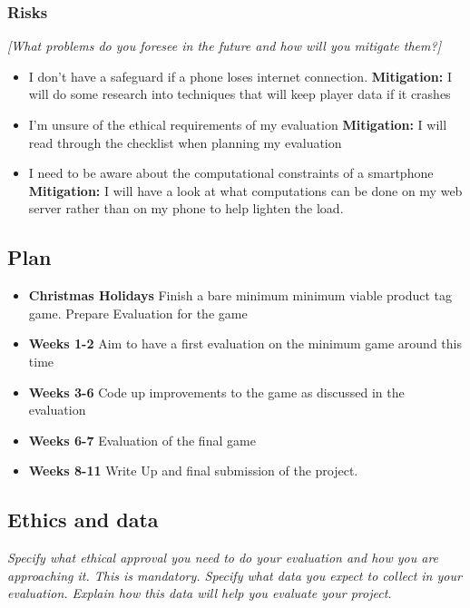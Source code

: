 \documentclass[11pt]{article}
\begin{document}
\subsubsection{Risks}\label{risks}

\emph{{[}What problems do you foresee in the future and how will you
mitigate them?{]}}

\begin{itemize}
    \tightlist
    \item I don't have a safeguard if a phone loses internet connection. \textbf{Mitigation:} I will do some research into techniques that will keep player data if it crashes
    \item I'm unsure of the ethical requirements of my evaluation \textbf{Mitigation:} I will read through the checklist when planning my evaluation
    \item I need to be aware about the computational constraints of a smartphone \textbf{Mitigation:} I will have a look at what computations can be done on my web server rather than on my phone to help lighten the load.
\end{itemize}

\subsection{Plan}\label{plan}

\begin{itemize}
    \tightlist
    \item \textbf{Christmas Holidays} Finish a bare minimum minimum viable product tag game. Prepare Evaluation for the game
    \item \textbf{Weeks 1-2} Aim to have a first evaluation on the minimum game around this time
    \item \textbf{Weeks 3-6} Code up improvements to the game as discussed in the evaluation
    \item \textbf{Weeks 6-7} Evaluation of the final game
    \item \textbf{Weeks 8-11} Write Up and final submission of the project.
\end{itemize}


    
\subsection{Ethics and data}\label{ethics}
\emph{Specify what ethical approval you need to do your evaluation and how you are approaching it. This is mandatory. 
Specify what data you expect to collect in your evaluation. Explain how this data will help you evaluate your project.
}
\end{document}
